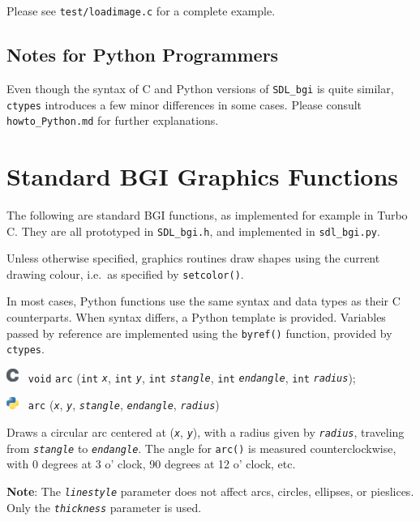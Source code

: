 \documentclass[a4paper,12pt]{article}
\newcommand{\ntt}[1]{\texttt{#1}}
\newcommand{\V}{\ntt{void}}          %
\newcommand{\I}{\ntt{int}}           %
\newcommand{\fn}[1]{\ntt{#1}}        %
\newcommand{\p}[1]{\emph{\ntt{#1}}}  %
\newcommand{\F}[1]{\ntt{#1}}         %
\newcommand{\T}[1]{\ntt{#1}}         %
\newcommand{\file}[1]{\ntt{#1}}      %
\newcommand{\SDLbgi}{\texttt{SDL\_bgi}}
\newcommand{\Clogo}{\raisebox{-.25\height}%
{\includegraphics[width=0.4cm]{C.png}~}}
\newcommand{\Plogo}{\raisebox{-.25\height}%
{\includegraphics[width=0.4cm]{Python.png}~}}
\newenvironment{bgi}
{ %
  \begin{snugshade}
}
{ %
  \end{snugshade}
}
\begin{document}
Please see \file{test/loadimage.c} for a complete example.


\subsection{Notes for Python Programmers}
\label{sec:python}

Even though the syntax of C and Python versions of \SDLbgi{} is quite
similar, \ntt{ctypes} introduces a few minor differences in some
cases. Please consult \file{howto\_Python.md} for further
explanations.


\section{Standard BGI Graphics Functions}

The following are standard BGI functions, as implemented for example
in Turbo C. They are all prototyped in \F{SDL\_bgi.h}, and implemented
in \F{sdl\_bgi.py}.

Unless otherwise specified, graphics routines draw shapes using the
current drawing colour, i.e.\ as specified by \fn{setcolor()}.

In most cases, Python functions use the same syntax and data types as
their C counterparts. When syntax differs, a Python template is
provided. Variables passed by reference are implemented
using the \T{byref()} function, provided by \T{ctypes}.


\addcontentsline{toc}{subsection}{\T{arc()}}
\label{sec:arc}

\begin{bgi}
\Clogo{} \V{} \fn{arc} (\I{} \p{x}, \I{} \p{y}, \I{} \p{stangle}, \I{}
\p{endangle}, \I{} \p{radius});

\Plogo{} \fn{arc} (\p{x}, \p{y}, \p{stangle}, \p{endangle},
\p{radius})

\end{bgi}

Draws a circular arc centered at (\p{x}, \p{y}), with a radius given
by \p{radius}, traveling from \p{stangle} to \p{endangle}. The angle
for \fn{arc()} is measured counterclockwise, with 0 degrees at 3 o'
clock, 90 degrees at 12 o' clock, etc.

\textbf{Note}: The \p{linestyle} parameter does not affect arcs,
circles, ellipses, or pie\-slices. Only the \p{thickness} parameter is
used.
\end{document}
